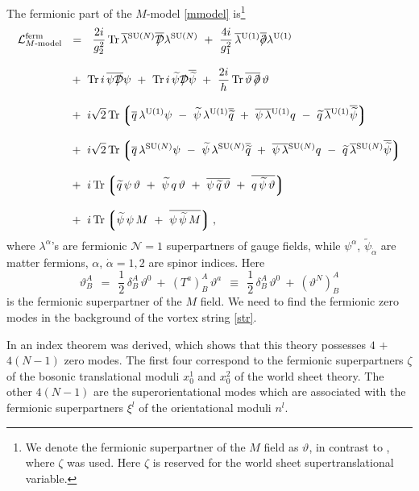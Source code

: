 \documentclass[12pt]{article}
\def\Tr{{\rm Tr}}
\newcommand{\none}{${\mathcal N}=1$ }
\newcommand{\p}{\partial}
\newcommand{\wt}{\widetilde}
\newcommand{\ov}{\overline}
\newcommand{\mc}[1]{\mathcal{#1}}
\newcommand{\md}{\mathcal{D}}
\newcommand{\lgr}{\left\lgroup}
\newcommand{\rgr}{\right\rgroup}
\def\slashed#1{\setbox0=\hbox{$#1$}             %
   \dimen0=\wd0                                 %
   \setbox1=\hbox{/} \dimen1=\wd1               %
   \ifdim\dimen0>\dimen1                        %
      \rlap{\hbox to \dimen0{\hfil/\hfil}}      %
      #1                                        %
   \else                                        %
      \rlap{\hbox to \dimen1{\hfil$#1$\hfil}}   %
      /                                         %
   \fi}                                        %
\begin{document}
	The fermionic part of the $M$-model \eqref{mmodel} is\footnote{
We denote the fermionic superpartner of the $M$ field as $\vartheta$, in contrast to \cite{GSYmmodel},
where $\zeta$ was used. Here $\zeta$ is reserved for the world sheet supertranslational variable.}
\begin{align}
%
\notag
	\mc{L}_\text{$M$-model}^\text{ferm} & ~~=~~ 
		\frac{2i}{g_2^2}\, \Tr\, \ov{\lambda}{}^\text{SU($N$)} \ov{\slashed{\md}} \lambda^{\text{SU($N$)}}
		~+~ \frac{4i}{g_1^2}\, \ov{\lambda}{}^\text{U(1)} \ov{\slashed{\p}} \lambda^\text{U(1)}
	\\[3mm]
%
\notag
	&~
 		~+~ \Tr\, i\, \ov{\psi \slashed{\md}} \psi  
		~+~ \Tr\, i\, \wt{\psi} \slashed{\md} \ov{\wt{\psi}}
		~+~ \frac{2i}{h}\, \Tr\, \ov{\vartheta\,\slashed{\p}}\,\vartheta
	\\[3mm]
%
\label{fermact}
	&~
		~+~
		i \sqrt{2}\, \Tr 
		\lgr \ov{q}\,\lambda^\text{U(1)}\psi ~-~ \wt{\psi}\,\lambda^\text{U(1)}\ov{\wt{q}}
		 ~+~ \ov{\psi\, \lambda}{}^\text{U(1)} q ~-~ \wt{q}\,\ov{\lambda}{}^\text{U(1)}\ov{\wt{\psi}} \rgr
	\\[3mm]
%
\notag
	&~
		~+~
		i \sqrt{2}\, \Tr
		\lgr \ov{q}\,\lambda^\text{SU($N$)}\psi ~-~ \wt{\psi}\,\lambda^\text{SU($N$)}\ov{\wt{q}}
		 ~+~ \ov{\psi\, \lambda}{}^\text{SU($N$)}q ~-~ \wt{q}\,\ov{\lambda}{}^\text{SU($N$)}\ov{\wt{\psi}} \rgr
	\\[3mm]
%
\notag
	&~
		~+~
		i\,\Tr \lgr
			    \wt{q}\, \psi\,\vartheta ~+~ \wt{\psi}\,q\,\vartheta 
			~+~ \ov{\psi\, \wt{q}\,\vartheta}  ~+~ \ov{q\,\wt{\psi}\,\vartheta} \rgr
	\\[3mm]
%
\notag
	&~
		~+~
		i\,\Tr \lgr
				\wt{\psi}\,\psi\,M ~+~ \ov{\psi\, \wt{\psi}\, M} \rgr ,
\end{align}
where $\lambda^{\alpha}$'s are fermionic \none superpartners of gauge fields, while $\psi^{\alpha}$,
 $\tilde{\psi}_{\dot{\alpha}}$ are matter fermions, $\alpha$, $\dot{\alpha}=1,2$ are spinor indices.
	Here 
\[
	\vartheta^A_B ~~=~~ \frac{1}{2}\,\delta^A_B\, \vartheta^0  ~+~
				(T^a)^A_B\, \vartheta^{a}  ~~\equiv~~
			\frac{1}{2}\,\delta^A_B\, \vartheta^0  ~+~
				(\vartheta^N)^A_B
\]
	is the fermionic superpartner of the $M$ field.
	We need to find the fermionic zero modes in the background of the vortex string \eqref{str}.

	In \cite{GSYmmodel} an index theorem was derived, which shows that this theory possesses
	$ 4 $ $ + $ $ 4 ( N - 1 ) $ zero modes.
	The first four correspond to the fermionic superpartners $ \zeta $ of the bosonic translational moduli
	$ x_0^1 $ and $ x_0^2 $ of the world sheet theory. 
	The other $ 4 ( N - 1 ) $ are the superorientational modes which are associated with the 
	fermionic superpartners $ \xi^l $ of the orientational moduli $ n^l $.
\end{document}
